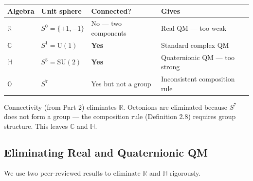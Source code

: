 \documentclass[11pt]{article}
\theoremstyle{definition}
\theoremstyle{remark}
\begin{document}
{\def\LTcaptype{none} %
\begin{longtable}[]{@{}
  >{\raggedright\arraybackslash}p{}
  >{\raggedright\arraybackslash}p{}
  >{\raggedright\arraybackslash}p{}
  >{\raggedright\arraybackslash}p{}@{}}
\toprule\noalign{}
\begin{minipage}[b]{\linewidth}\raggedright
Algebra
\end{minipage} & \begin{minipage}[b]{\linewidth}\raggedright
Unit sphere
\end{minipage} & \begin{minipage}[b]{\linewidth}\raggedright
Connected?
\end{minipage} & \begin{minipage}[b]{\linewidth}\raggedright
Gives
\end{minipage} \\
\midrule\noalign{}
\endhead
\bottomrule\noalign{}
\endlastfoot
\(\mathbb{R}\) & \(S^0 = \{+1, -1\}\) & No --- two components & Real QM
--- too weak \\
\(\mathbb{C}\) & \(S^1 = \mathrm{U}(1)\) & \textbf{Yes} & Standard
complex QM \\
\(\mathbb{H}\) & \(S^3 = \mathrm{SU}(2)\) & \textbf{Yes} & Quaternionic
QM --- too strong \\
\(\mathbb{O}\) & \(S^7\) & Yes but not a group & Inconsistent
composition rule \\
\end{longtable}
}

Connectivity (from Part 2) eliminates \(\mathbb{R}\). Octonions are
eliminated because \(S^7\) does not form a group --- the composition
rule (Definition 2.8) requires group structure. This leaves
\(\mathbb{C}\) and \(\mathbb{H}\).

\subsection{Eliminating Real and Quaternionic
QM}\label{eliminating-real-and-quaternionic-qm}

We use two peer-reviewed results to eliminate \(\mathbb{R}\) and
\(\mathbb{H}\) rigorously.
\end{document}
